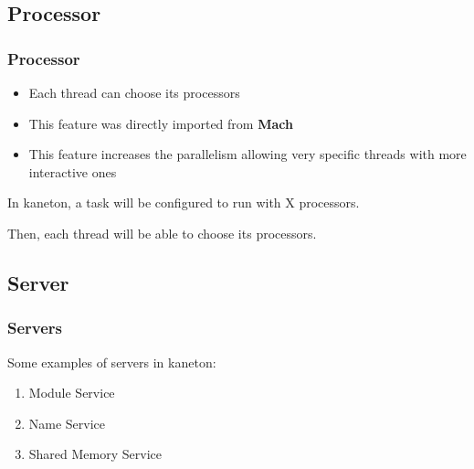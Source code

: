 \documentclass[8pt]{beamer}
\newcommand{\nl}[0]{\vspace{0.4cm}}
\begin{document}
%
%

\subsection{Processor}


\begin{frame}
  \frametitle{Processor}

  \begin{itemize}
    \item
      Each thread can choose its processors
    \item
      This feature was directly imported from \textbf{Mach}
    \item
      This feature increases the parallelism allowing very
      specific threads with more interactive ones
  \end{itemize}

  In kaneton, a task will be configured to run with X processors.

  \nl

  Then, each thread will be able to choose its processors.
\end{frame}

%
%

\subsection{Server}


\begin{frame}
  \frametitle{Servers}

  Some examples of servers in kaneton:

  \begin{enumerate}
    \item
      Module Service
    \item
      Name Service
    \item
      Shared Memory Service
  \end{enumerate}
\end{frame}

\end{document}
